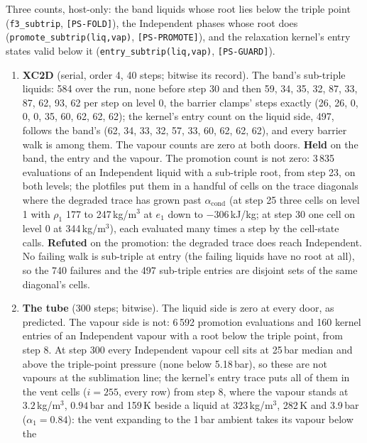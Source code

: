 \documentclass[11pt,a4paper]{article}
\newcommand{\code}[1]{\texttt{\small #1}}
\begin{document}
Three counts, host-only: the band liquids whose root lies below the
triple point (\code{f3\_subtrip}, \code{[PS-FOLD]}), the Independent
phases whose root does (\code{promote\_subtrip(liq,vap)},
\code{[PS-PROMOTE]}), and the relaxation kernel's entry states valid
below it (\code{entry\_subtrip(liq,vap)}, \code{[PS-GUARD]}).
\begin{enumerate}[nosep]
\item \textbf{XC2D} (serial, order 4, 40 steps; bitwise its record).
      The band's sub-triple liquids: 584 over the run, none before step
      30 and then 59, 34, 35, 32, 87, 33, 87, 62, 93, 62 per step on
      level 0, the barrier clamps' steps exactly (26, 26, 0, 0, 0, 35,
      60, 62, 62, 62); the kernel's entry count on the liquid side, 497,
      follows the band's (62, 34, 33, 32, 57, 33, 60, 62, 62, 62), and
      every barrier walk is among them.  The vapour counts are zero at
      both doors.  \textbf{Held} on the band, the entry and the vapour.
      The promotion count is not zero: 3\,835 evaluations of an
      Independent liquid with a sub-triple root, from step 23, on both
      levels; the plotfiles put them in a handful of cells on the trace
      diagonals where the degraded trace has grown past
      $\alpha_{\mathrm{cond}}$ (at step 25 three cells on level 1 with
      $\rho_1$ 177 to 247\,kg/m$^3$ at $e_1$ down to $-306$\,kJ/kg; at
      step 30 one cell on level 0 at 344\,kg/m$^3$), each evaluated many
      times a step by the cell-state calls.  \textbf{Refuted} on the
      promotion: the degraded trace does reach Independent.  No failing
      walk is sub-triple at entry (the failing liquids have no root at
      all), so the 740 failures and the 497 sub-triple entries are
      disjoint sets of the same diagonal's cells.
\item \textbf{The tube} (300 steps; bitwise).  The liquid side is zero
      at every door, as predicted.  The vapour side is not: 6\,592
      promotion evaluations and 160 kernel entries of an Independent
      vapour with a root below the triple point, from step 8.  At step
      300 every Independent vapour cell sits at 25\,bar median and above
      the triple-point pressure (none below 5.18\,bar), so these are not
      vapours at the sublimation line; the kernel's entry trace puts all of them in the vent cells
      ($i = 255$, every row) from step 8, where the vapour stands at
      $3.2$\,kg/m$^3$, $0.94$\,bar and 159\,K beside a liquid at
      323\,kg/m$^3$, 282\,K and 3.9\,bar ($\alpha_1 = 0.84$): the vent
      expanding to the 1\,bar ambient takes its vapour below the

\end{enumerate}
\end{document}
